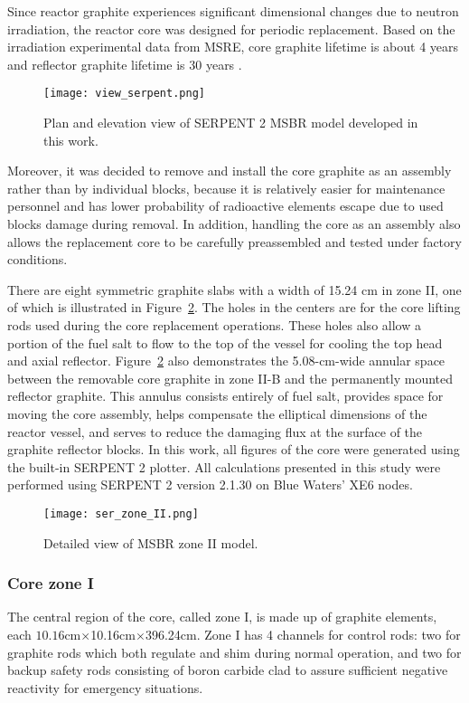 Since reactor graphite experiences significant dimensional changes due to neutron irradiation, the reactor core was designed for periodic replacement. Based on the irradiation experimental data from \gls{MSRE}, core graphite lifetime is about 4 years and reflector graphite lifetime is 30 years \cite{robertson_conceptual_1971}.

\begin{figure}[hbp!] %
  \centering
  \texttt{[image: view\_serpent.png]}
  \caption{Plan and elevation view of SERPENT 2 \gls{MSBR} model developed in this work.}
  \label{fig:serpent_plan_view}
\end{figure}

Moreover, it was decided to remove and install the core graphite as an assembly rather than by individual blocks, because it is relatively easier for maintenance personnel and has lower probability of radioactive elements escape due to used blocks damage during removal. In addition, handling the core as an assembly also allows the replacement core to be carefully preassembled and tested under factory conditions.

There are eight symmetric graphite slabs with a width of 15.24 cm in zone II, one of which is illustrated in Figure~\ref{fig:serpent_zoneII}. The holes in the centers are for the core lifting rods used during the core replacement operations. These holes also allow a portion of the fuel salt to flow to the top of the vessel for cooling the top head and axial reflector. Figure~\ref{fig:serpent_zoneII} also demonstrates the 5.08-cm-wide annular space between the removable core graphite in zone II-B and the permanently mounted reflector graphite. This annulus consists entirely of fuel salt, provides space for moving the core assembly, helps compensate the elliptical dimensions of the reactor vessel, and serves to reduce the damaging flux at the surface of the graphite reflector blocks. In this work, all figures of the core were generated using the built-in SERPENT 2 plotter. All calculations presented in this study were performed using SERPENT 2 version 2.1.30 on Blue Waters’ XE6 nodes. 

\begin{figure}[t!] %
  \centering
  \texttt{[image: ser\_zone\_II.png]}
  \caption{Detailed view of \gls{MSBR} zone II model.}
  \label{fig:serpent_zoneII}
\end{figure}

\subsubsection{Core zone I}
The central region of the core, called zone I, is made up of graphite elements, each $10.16$cm$\times$10.16cm$\times$396.24cm. Zone I has 4 channels for control rods: two for graphite rods which both regulate and shim during normal operation, and two for backup safety rods consisting of boron carbide clad to assure sufficient negative reactivity for emergency situations.

